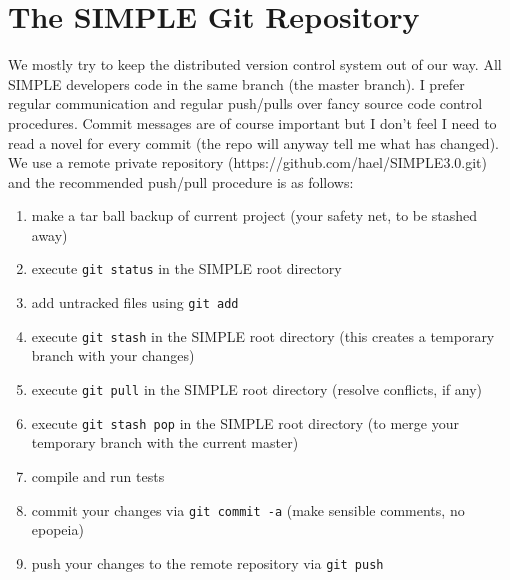 \documentclass[a4paper,11pt]{article}
\begin{document}
\section{The SIMPLE Git Repository}
We mostly try to keep the distributed version control system out of our way. All SIMPLE developers code in the same branch (the master branch). I prefer regular communication and regular push/pulls over fancy source code control procedures. Commit messages are of course important but I don't feel I need to read a novel for every commit (the repo will anyway tell me what has changed). We use a remote private repository (https://github.com/hael/SIMPLE3.0.git) and the recommended push/pull procedure is as follows:
\begin{enumerate}
\item make a tar ball backup of current project (your safety net, to be stashed away)
\item execute \texttt{git status} in the SIMPLE root directory
\item add untracked files using \texttt{git add}
\item execute \texttt{git stash} in the SIMPLE root directory (this creates a temporary branch with your changes)
\item execute \texttt{git pull} in the SIMPLE root directory (resolve conflicts, if any)
\item execute \texttt{git stash pop} in the SIMPLE root directory (to merge your temporary branch with the current master)
\item compile and run tests
\item commit your changes via \texttt{git commit -a} (make sensible comments, no epopeia)
\item push your changes to the remote repository via \texttt{git push}
\end{enumerate}
\end{document}
